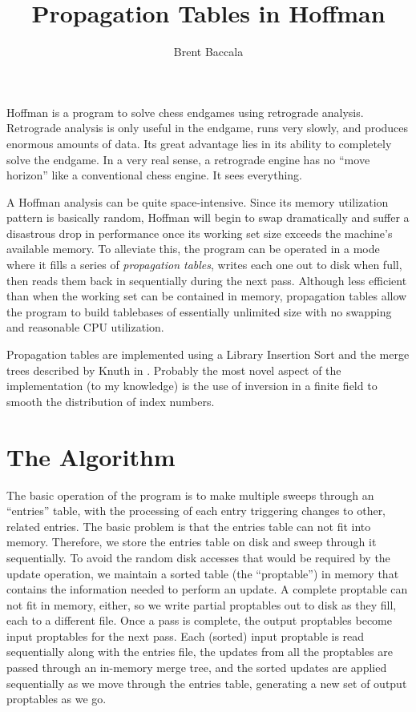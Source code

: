 \documentclass[11pt]{article}
\title{Propagation Tables in Hoffman}
\author{Brent Baccala}
\begin{document}
\maketitle

\parindent 0pt
\parskip 12pt

Hoffman is a program to solve chess endgames using retrograde
analysis.  Retrograde analysis is only useful in the endgame, runs
very slowly, and produces enormous amounts of data.  Its great
advantage lies in its ability to completely solve the endgame.  In a
very real sense, a retrograde engine has no ``move horizon'' like a
conventional chess engine.  It sees everything.

A Hoffman analysis can be quite space-intensive.  Since its
memory utilization pattern is basically random, Hoffman will begin to
swap dramatically and suffer a disastrous drop in performance once its
working set size exceeds the machine's available memory.  To alleviate
this, the program can be operated in a mode where it fills a series of
{\it propagation tables}, writes each one out to disk when full, then
reads them back in sequentially during the next pass.  Although less
efficient than when the working set can be contained in memory,
propagation tables allow the program to build tablebases of
essentially unlimited size with no swapping and reasonable CPU
utilization.

Propagation tables are implemented using a Library Insertion Sort and
the merge trees described by Knuth in \cite{knuth}.  Probably the most
novel aspect of the implementation (to my knowledge) is the use of
inversion in a finite field to smooth the distribution of index
numbers.

\section{The Algorithm}

The basic operation of the program is to make multiple sweeps through
an ``entries'' table, with the processing of each entry triggering
changes to other, related entries.  The basic problem is that the
entries table can not fit into memory.  Therefore, we store the
entries table on disk and sweep through it sequentially.  To avoid the
random disk accesses that would be required by the update operation,
we maintain a sorted table (the ``proptable'') in memory that contains
the information needed to perform an update.  A complete proptable can
not fit in memory, either, so we write partial proptables out to disk
as they fill, each to a different file.  Once a pass is complete, the
output proptables become input proptables for the next pass.  Each
(sorted) input proptable is read sequentially along with the entries
file, the updates from all the proptables are passed through an
in-memory merge tree, and the sorted updates are applied sequentially
as we move through the entries table, generating a new set of output
proptables as we go.
\end{document}
